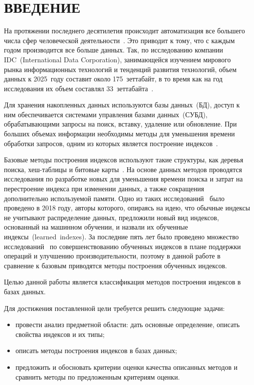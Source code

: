 \chapter*{ВВЕДЕНИЕ}

На протяжении последнего десятилетия происходит автоматизация все большего числа
сфер человеческой деятельности~\cite{koptenok}. Это приводит к тому, что с
каждым годом производится все больше данных. Так, по исследованию компании
IDC~(International Data Corporation), занимающейся изучением мирового рынка
информационных технологий и тенденций развития технологий, объем данных к
2025~году составит около 175~зеттабайт, в то время как на год исследования их
объем составлял 33~зеттабайта~\cite{idc}.

Для хранения накопленных данных используются базы данных~(БД), доступ к ним
обеспечивается системами управления базами данных~(СУБД), обрабатывающими
запросы на поиск, вставку, удаление или обновление. При больших объемах
информации необходимы методы для уменьшения времени обработки запросов, одним из
которых является построение индексов~\cite{bits}.

Базовые методы построения индексов используют такие структуры, как деревья
поиска, хеш-таблицы и битовые карты~\cite{dama}. На основе данных методов
проводятся исследования по разработке новых для уменьшения времени поиска и
затрат на перестроение индекса при изменении данных, а также сокращения
дополнительно используемой памяти. Одно из таких исследований~\cite{main} было
проведено в 2018 году, авторы которого, опираясь на идею, что обычные индексы не
учитывают распределение данных, предложили новый вид индексов, основанный на
машинном обучении, и назвали их обученные индексы~(learned~indexes). За
последние пять лет было проведено множество исследований~\cite{alex, apex,
ulipp, pgmi} по совершенствованию обученных индексов в плане поддержки операций
и улучшению производительности, поэтому в данной работе в сравнение к базовым
приводятся методы построения обученных индексов.


Целью данной работы является классификация методов построения индексов в
базах данных.

Для достижения поставленной цели требуется решить следующие задачи:
\begin{itemize}
    \item провести анализ предметной области: дать основные определение, описать
        свойства индексов и их типы;
    \item описать методы построения индексов в базах данных;
    \item предложить и обосновать критерии оценки качества описанных методов
      и сравнить методы по предложенным критериям оценки.
\end{itemize}
